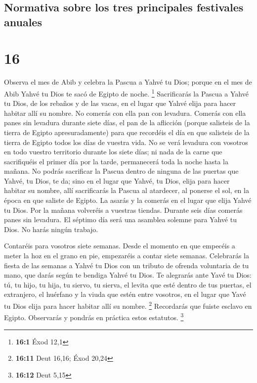 \hypertarget{normativa-sobre-los-tres-principales-festivales-anuales}{%
\subsection{Normativa sobre los tres principales festivales
anuales}\label{normativa-sobre-los-tres-principales-festivales-anuales}}

\hypertarget{section-15}{%
\section{16}\label{section-15}}

 Observa el mes de Abib y celebra la Pascua a Yahvé tu
Dios; porque en el mes de Abib Yahvé tu Dios te sacó de Egipto de noche.
\footnote{\textbf{16:1} Éxod 12,1}  Sacrificarás la Pascua
a Yahvé tu Dios, de los rebaños y de las vacas, en el lugar que Yahvé
elija para hacer habitar allí su nombre.  No comerás con
ella pan con levadura. Comerás con ella panes sin levadura durante siete
días, el pan de la aflicción (porque salisteis de la tierra de Egipto
apresuradamente) para que recordéis el día en que salisteis de la tierra
de Egipto todos los días de vuestra vida.  No se verá
levadura con vosotros en todo vuestro territorio durante los siete días;
ni nada de la carne que sacrifiquéis el primer día por la tarde,
permanecerá toda la noche hasta la mañana.  No podrás
sacrificar la Pascua dentro de ninguna de las puertas que Yahvé, tu
Dios, te da;  sino en el lugar que Yahvé, tu Dios, elija
para hacer habitar su nombre, allí sacrificarás la Pascua al atardecer,
al ponerse el sol, en la época en que saliste de Egipto. 
La asarás y la comerás en el lugar que elija Yahvé tu Dios. Por la
mañana volveréis a vuestras tiendas.  Durante seis días
comerás panes sin levadura. El séptimo día será una asamblea solemne
para Yahvé tu Dios. No harás ningún trabajo.

 Contaréis para vosotros siete semanas. Desde el momento
en que empecéis a meter la hoz en el grano en pie, empezaréis a contar
siete semanas.  Celebrarás la fiesta de las semanas a
Yahvé tu Dios con un tributo de ofrenda voluntaria de tu mano, que darás
según te bendiga Yahvé tu Dios.  Te alegrarás ante Yavé
tu Dios: tú, tu hijo, tu hija, tu siervo, tu sierva, el levita que esté
dentro de tus puertas, el extranjero, el huérfano y la viuda que estén
entre vosotros, en el lugar que Yavé tu Dios elija para hacer habitar
allí su nombre. \footnote{\textbf{16:11} Deut 16,16; Éxod 20,24}
 Recordarás que fuiste esclavo en Egipto. Observarás y
pondrás en práctica estos estatutos. \footnote{\textbf{16:12} Deut 5,15}

